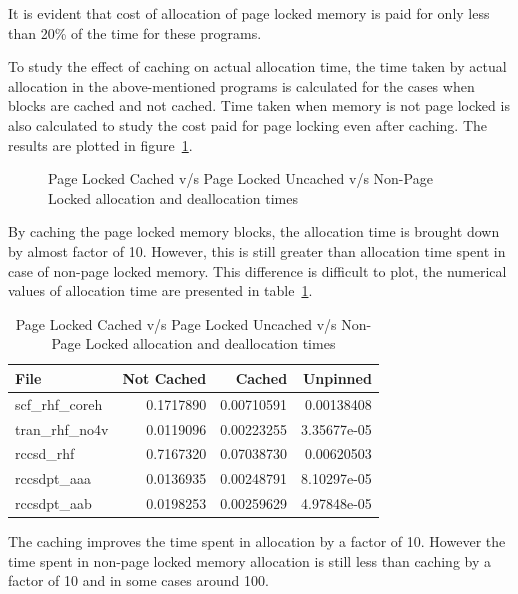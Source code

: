 It is evident that cost of allocation of page locked memory is
paid for only less than 20\% of the time for these programs.

To study the effect of caching on actual allocation time, the time taken by actual
allocation in the above-mentioned programs is calculated for the cases when blocks
are cached and not cached. Time taken when memory is not page locked is
also calculated to study the cost paid for page locking even after caching.
The results are plotted in figure~\ref{fig:mempin_caching}.

\begin{figure}[h]
  
  \caption{Page Locked Cached v/s Page Locked Uncached v/s Non-Page Locked allocation
  and deallocation times}
  \label{fig:mempin_caching}
\end{figure}

By caching the page locked memory blocks, the allocation time is brought down by
almost factor of 10. However, this is still greater than allocation time spent in
case of non-page locked memory. This difference is difficult to plot, the numerical
values of allocation time are presented in table~\ref{tab:mempin_caching}.

\begin{table}[h]
  \centering
  \caption{Page Locked Cached v/s Page Locked Uncached v/s Non-Page Locked allocation
  and deallocation times}
  \begin{tabular}{l r r r}
    \hline
    File            & Not Cached & Cached     & Unpinned    \\
    \hline
    scf\_rhf\_coreh & 0.1717890  & 0.00710591 & 0.00138408  \\
    tran\_rhf\_no4v & 0.0119096  & 0.00223255 & 3.35677e-05 \\
    rccsd\_rhf      & 0.7167320  & 0.07038730 & 0.00620503  \\
    rccsdpt\_aaa    & 0.0136935  & 0.00248791 & 8.10297e-05 \\
    rccsdpt\_aab    & 0.0198253  & 0.00259629 & 4.97848e-05 \\
    \hline
  \end{tabular}
  \label{tab:mempin_caching}
\end{table}

The caching improves the time spent in allocation by a factor of 10. However the time
spent in non-page locked memory allocation is still less than caching by a factor
of 10 and in some cases around 100.

